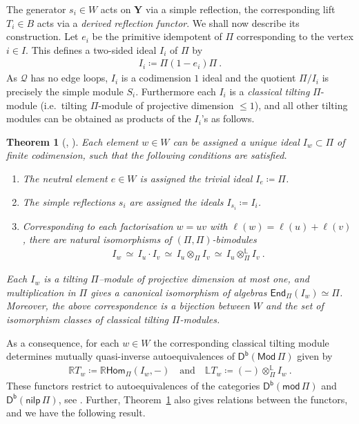 \documentclass[reqno,a4paper]{amsart}
\newcommand{\LL}{\mathbb{L}}
\newcommand{\R}{\mathbb{R}}
\newcommand{\bfY}{\mathbf{Y}}
\newcommand{\catMod}{\mathsf{Mod}}
\newcommand{\catmod}{\mathsf{mod}}
\newcommand{\modPi}{\catmod\, \Pi}
\newcommand{\ModPi}{\catMod\, \Pi}
\newcommand{\nilpPi}{\mathsf{nilp}\, \Pi}
\newcommand{\catDb}{\mathsf{D}^\mathsf{b}}
\newcommand{\qv}{\mathcal{Q}}
\newcommand{\rootlattice}{\bfY}
\newcommand{\Hom}{\mathsf{Hom}}
\newcommand{\End}{\mathsf{End}}
\theoremstyle{basic-theorem}
\newtheorem{theorem}{Theorem}[section]
\numberwithin{equation}{section}
\begin{document}
The generator $s_i\in W$ acts on $\rootlattice$ via a simple reflection, the corresponding lift $T_i\in B$ acts via a \textit{derived reflection functor}. We shall now describe its construction. Let $e_i$ be the primitive idempotent of $\Pi$ corresponding to the vertex $i\in I$. This defines a two-sided ideal $I_i$ of $\Pi$ by
\begin{align}
	I_i\coloneqq \Pi(1-e_i)\Pi\ .
\end{align}
As $\qv$ has no edge loops, $I_i$ is a codimension $1$ ideal and the quotient $\Pi/I_i$ is precisely the simple module $S_i$. Furthermore each $I_i$ is a \textit{classical tilting} $\Pi$-module (i.e.\ tilting $\Pi$-module of projective dimension $\leq 1$), and all other tilting modules can be obtained as products of the $I_i$'s as follows.
\begin{theorem}[{\cite[Theorems~2.20, 2.21, and 2.26]{SY13}, \cite[Theorem~6.2]{IR08}}]\label{thm:reflection-functors}
    Each element $w\in W$ can be assigned a unique ideal $I_w\subset \Pi$ of finite codimension, such that the following conditions are satisfied.
	\begin{enumerate}\itemsep0.2cm
        \item The neutral element $e\in W$ is assigned the trivial ideal $I_e\coloneqq\Pi$.
        \item The simple reflections $s_i$ are assigned the ideals $I_{s_i}\coloneqq I_i$.
        \item Corresponding to each factorisation $w=uv$ with $\ell(w)=\ell(u)+\ell(v)$, there are natural isomorphisms of $(\Pi,\Pi)$-bimodules
		\begin{align}
			I_w \, \simeq \, I_u\cdot I_v \, \simeq\, I_u \otimes_\Pi I_v \, \simeq\, I_u\otimes_\Pi^\LL I_v\ .
		\end{align}
	\end{enumerate}
    Each $I_w$ is a tilting $\Pi$--module of projective dimension at most one, and multiplication in $\Pi$ gives a canonical isomorphism of algebras $\End_{\Pi}(I_w)\simeq \Pi$. Moreover, the above correspondence is a bijection between $W$ and the set of isomorphism classes of classical tilting $\Pi$-modules.
\end{theorem}

As a consequence, for each $w\in W$ the corresponding classical tilting module determines mutually quasi-inverse autoequivalences of $\catDb(\ModPi)$ given by
\begin{align}
	\R T_w \coloneqq \R\Hom_{\Pi}(I_w,-)\quad \text{and} \quad \LL T_w\coloneqq (-)\otimes^\LL_{\Pi}I_w\ .
\end{align}
These functors restrict to autoequivalences of the categories $\catDb(\modPi)$ and $\catDb(\nilpPi)$, see \cite[Theorem~2.3 and Lemma~2.22]{SY13}. Further, Theorem~\ref{thm:reflection-functors} also gives relations between the functors, and we have the following result.
\end{document}
